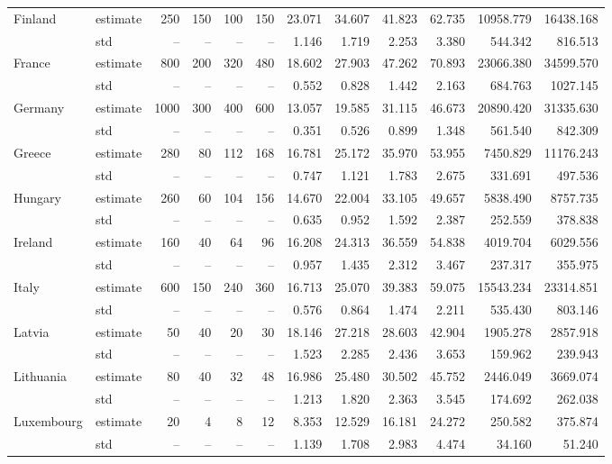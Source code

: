 \begin{table}[htbp]
\begin{tabular}{llrrrrrrrrrr}
\hline
Finland & estimate & 250 & 150 & 100 & 150 & 23.071 & 34.607 & 41.823 & 62.735 & 10958.779 & 16438.168 \\
 & std & -- & -- & -- & -- & 1.146 & 1.719 & 2.253 & 3.380 & 544.342 & 816.513 \\
\hline
France & estimate & 800 & 200 & 320 & 480 & 18.602 & 27.903 & 47.262 & 70.893 & 23066.380 & 34599.570 \\
 & std & -- & -- & -- & -- & 0.552 & 0.828 & 1.442 & 2.163 & 684.763 & 1027.145 \\
\hline
Germany & estimate & 1000 & 300 & 400 & 600 & 13.057 & 19.585 & 31.115 & 46.673 & 20890.420 & 31335.630 \\
 & std & -- & -- & -- & -- & 0.351 & 0.526 & 0.899 & 1.348 & 561.540 & 842.309 \\
\hline
Greece & estimate & 280 & 80 & 112 & 168 & 16.781 & 25.172 & 35.970 & 53.955 & 7450.829 & 11176.243 \\
 & std & -- & -- & -- & -- & 0.747 & 1.121 & 1.783 & 2.675 & 331.691 & 497.536 \\
\hline
Hungary & estimate & 260 & 60 & 104 & 156 & 14.670 & 22.004 & 33.105 & 49.657 & 5838.490 & 8757.735 \\
 & std & -- & -- & -- & -- & 0.635 & 0.952 & 1.592 & 2.387 & 252.559 & 378.838 \\
\hline
Ireland & estimate & 160 & 40 & 64 & 96 & 16.208 & 24.313 & 36.559 & 54.838 & 4019.704 & 6029.556 \\
 & std & -- & -- & -- & -- & 0.957 & 1.435 & 2.312 & 3.467 & 237.317 & 355.975 \\
\hline
Italy & estimate & 600 & 150 & 240 & 360 & 16.713 & 25.070 & 39.383 & 59.075 & 15543.234 & 23314.851 \\
 & std & -- & -- & -- & -- & 0.576 & 0.864 & 1.474 & 2.211 & 535.430 & 803.146 \\
\hline
Latvia & estimate & 50 & 40 & 20 & 30 & 18.146 & 27.218 & 28.603 & 42.904 & 1905.278 & 2857.918 \\
 & std & -- & -- & -- & -- & 1.523 & 2.285 & 2.436 & 3.653 & 159.962 & 239.943 \\
\hline
Lithuania & estimate & 80 & 40 & 32 & 48 & 16.986 & 25.480 & 30.502 & 45.752 & 2446.049 & 3669.074 \\
 & std & -- & -- & -- & -- & 1.213 & 1.820 & 2.363 & 3.545 & 174.692 & 262.038 \\
\hline
Luxembourg & estimate & 20 & 4 & 8 & 12 & 8.353 & 12.529 & 16.181 & 24.272 & 250.582 & 375.874 \\
 & std & -- & -- & -- & -- & 1.139 & 1.708 & 2.983 & 4.474 & 34.160 & 51.240 \\

\end{tabular}
\end{table}
